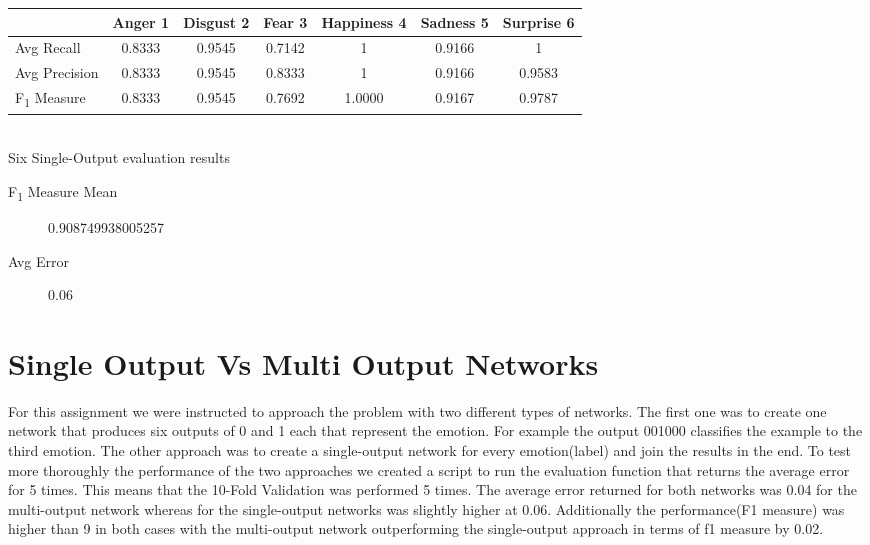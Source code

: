 \documentclass[a4paper,11pt]{article}
\begin{document}
                                                              
 \begin{center}                                                                  
 \begin{tabular}{ | l || c | c | c | c | c | c | }                               
     \hline                                                                      
           							& Anger 1 & Disgust 2 & Fear 3 & Happiness 4 & Sadness 5 & Surprise 6 \\ \hline \hline
         Avg Recall 				& 0.8333 & 0.9545 & 0.7142 & 1 & 0.9166 & 1 \\ \hline   
         Avg Precision 				& 0.8333 & 0.9545 & 0.8333 & 1 & 0.9166 & 0.9583 \\ \hline
         F\textsubscript{1} Measure & 0.8333 & 0.9545 & 0.7692 &  1.0000 &  0.9167 & 0.9787 \\ \hline
     \end{tabular}                                                               
     \\ Six Single-Output evaluation results                                                                                               
 \end{center}                                                                    


\begin{description}
	\item[F\textsubscript{1} Measure Mean] 0.908749938005257
	\item[Avg Error] 0.06
\end{description}


\section{Single Output Vs Multi Output Networks}
For this assignment we were instructed to approach the problem with two different types of networks. The first one was to create one network that produces six outputs of 0 and 1 each that represent the emotion. For example the output 001000 classifies the example to the third emotion. The other approach was to create a single-output network for every emotion(label) and join the results in the end.
To test more thoroughly the performance of the two approaches we created a script to run the evaluation function that returns the average error for 5 times. This means that the 10-Fold Validation was performed 5 times. The average error returned for both networks was 0.04 for the multi-output network whereas for the single-output networks was slightly higher at 0.06. Additionally the performance(F1 measure) was higher than 9 in both cases with the multi-output network outperforming the single-output approach in terms of f1 measure by 0.02.
\end{document}
